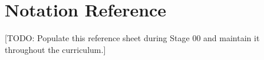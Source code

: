 
\section*{Notation Reference}

[TODO: Populate this reference sheet during Stage 00 and maintain it throughout the curriculum.]
